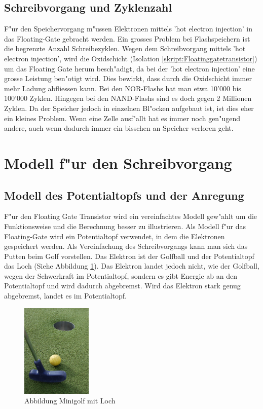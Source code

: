 \begin{refsection}
\subsection{Schreibvorgang und Zyklenzahl}
F"ur den Speichervorgang m"ussen Elektronen mittels 'hot electron injection'
in das Floating-Gate gebracht werden. Ein grosses Problem bei
Flashspeichern ist die begrenzte Anzahl Schreibezyklen.
Wegen dem Schreibvorgang mittels 'hot electron injection', wird die
Oxidschicht (Isolation \ref{skript:Floatinggatetransistor}) um das Floating Gate herum
besch"adigt, da bei der 'hot electron injection' eine grosse Leistung
ben"otigt wird.
Dies bewirkt, dass durch die Oxidschicht immer mehr Ladung abfliessen kann.
Bei den NOR-Flashs hat man etwa 10'000 bis 100'000 Zyklen.
Hingegen bei den NAND-Flashs sind es doch gegen 2 Millionen Zyklen.
Da der Speicher jedoch in einzelnen Bl"ocken aufgebaut ist, ist dies
eher ein kleines Problem.
Wenn eine Zelle ausf"allt hat es immer noch gen"ugend andere, auch wenn
dadurch immer ein bisschen an Speicher verloren geht.

\section{Modell f"ur den Schreibvorgang}
\subsection{Modell des Potentialtopfs und der Anregung}
F"ur den Floating Gate Transistor wird ein vereinfachtes Modell
gew"ahlt um die Funktionsweise und die Berechnung besser zu illustrieren.
Als Modell f"ur das Floating-Gate wird ein Potentialtopf verwendet,
in dem die Elektronen gespeichert werden.
Als Vereinfachung des Schreibvorgangs kann man sich das Putten beim
Golf vorstellen.
Das Elektron ist der Golfball und der Potentialtopf das Loch (Siehe Abbildung \ref{skript:Minigolf}).
Das Elektron landet jedoch nicht, wie der Golfball, wegen der Schwerkraft
im Potentialtopf, sondern es gibt Energie ab an den Potentialtopf und
wird dadurch abgebremst.
Wird das Elektron stark genug abgebremst, landet es im Potentialtopf.

\begin{figure}
\centering
\includegraphics[width=0.3\textwidth]{flash/graphics/Minigolf.jpg}
\caption{Abbildung Minigolf mit Loch \cite{flash:golf}
\label{skript:Minigolf}}
\end{figure}


\end{refsection}
